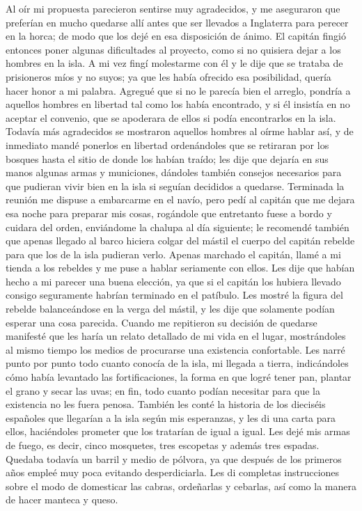 \documentclass{novela}
\begin{document}
    Al oír mi propuesta parecieron sentirse muy agradecidos, y me aseguraron que preferían en mucho quedarse allí antes que ser llevados a Inglaterra para perecer en la horca; de modo que los dejé en esa disposición de ánimo.
    El capitán fingió entonces poner algunas dificultades al proyecto, como si no quisiera dejar a los hombres en la isla.
    A mi vez fingí molestarme con él y le dije que se trataba de prisioneros míos y no suyos; ya que les había ofrecido esa posibilidad, quería hacer honor a mi palabra. Agregué que si no le parecía bien el arreglo, pondría a aquellos hombres en libertad tal como los había encontrado, y si él insistía en no aceptar el convenio, que se apoderara de ellos si podía encontrarlos en la isla.
    Todavía más agradecidos se mostraron aquellos hombres al oírme hablar así, y de inmediato mandé ponerlos en libertad ordenándoles que se retiraran por los bosques hasta el sitio de donde los habían traído; les dije que dejaría en sus manos algunas armas y municiones, dándoles también consejos necesarios para que pudieran vivir bien en la isla si seguían decididos a quedarse.
    Terminada la reunión me dispuse a embarcarme en el navío, pero pedí al capitán que me dejara esa noche para preparar mis cosas, rogándole que entretanto fuese a bordo y cuidara del orden, enviándome la chalupa al día siguiente; le recomendé también que apenas llegado al barco hiciera colgar del mástil el cuerpo del capitán rebelde para que los de la isla pudieran verlo.
    Apenas marchado el capitán, llamé a mi tienda a los rebeldes y me puse a hablar seriamente con ellos. Les dije que habían hecho a mi parecer una buena elección, ya que si el capitán los hubiera llevado consigo seguramente habrían terminado en el patíbulo. Les mostré la figura del rebelde balanceándose en la verga del mástil, y les dije que solamente podían esperar una cosa parecida.
    Cuando me repitieron su decisión de quedarse manifesté que les haría un relato detallado de mi vida en el lugar, mostrándoles al mismo tiempo los medios de procurarse una existencia confortable. Les narré punto por punto todo cuanto conocía de la isla, mi llegada a tierra, indicándoles cómo había levantado las fortificaciones, la forma en que logré tener pan, plantar el grano y secar las uvas; en fin, todo cuanto podían necesitar para que la existencia no les fuera penosa. También les conté la historia de los dieciséis españoles que llegarían a la isla según mis esperanzas, y les di una carta para ellos, haciéndoles prometer que los tratarían de igual a igual.
    Les dejé mis armas de fuego, es decir, cinco mosquetes, tres escopetas y además tres espadas. Quedaba todavía un barril y medio de pólvora, ya que después de los primeros años empleé muy poca evitando desperdiciarla. Les di completas instrucciones sobre el modo de domesticar las cabras, ordeñarlas y cebarlas, así como la manera de hacer manteca y queso.
\end{document}
